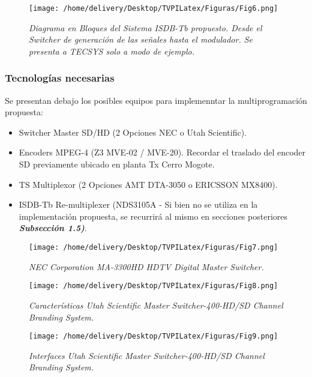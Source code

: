 \documentclass[a4paper,11pt]{article} %
\begin{document}
\begin{figure}[htb] 
\centering
\texttt{[image: /home/delivery/Desktop/TVPILatex/Figuras/Fig6.png]}
\caption{\emph{Diagrama en Bloques del Sistema ISDB-Tb
propuesto. Desde el Switcher de generaci\'on de las se\~nales hasta el
modulador. Se presenta a TECSYS solo a modo de ejemplo.}}
\end{figure} 

\newpage
\subsubsection{Tecnolog\'ias necesarias}

Se presentan debajo los posibles equipos para implemenntar la
multiprogramación propuesta:

\begin{itemize}
\item Switcher Master SD/HD (2 Opciones NEC o Utah Scientific). 
\item Encoders MPEG-4 (Z3 MVE-02 / MVE-20). Recordar el traslado del
encoder SD previamente ubicado en planta Tx Cerro Mogote. 
\item TS Multiplexor (2 Opciones AMT DTA-3050 o ERICSSON MX8400).
\item ISDB-Tb Re-multiplexer (NDS3105A - Si bien no se utiliza en la
implementaci\'on propuesta, se recurrir\'a al mismo en secciones
posteriores \textbf{\emph{Subsecci\'on 1.5)}}. 
\end{itemize} 

\begin{figure}[h!] 
\centering
\texttt{[image: /home/delivery/Desktop/TVPILatex/Figuras/Fig7.png]}
\caption{\emph{NEC Corporation MA-3300HD HDTV Digital Master Switcher.
}}
\end{figure} 

\begin{figure}[h!] 
\centering
\texttt{[image: /home/delivery/Desktop/TVPILatex/Figuras/Fig8.png]}
\caption{\emph{Caracter\'isticas Utah Scientific Master
Switcher-400-HD/SD Channel Branding System.
}}
\end{figure} 

\begin{figure}[h!] 
\centering
\texttt{[image: /home/delivery/Desktop/TVPILatex/Figuras/Fig9.png]}
\caption{\emph{Interfaces Utah Scientific Master
Switcher-400-HD/SD Channel Branding System.}}
\end{figure}
\end{document}
